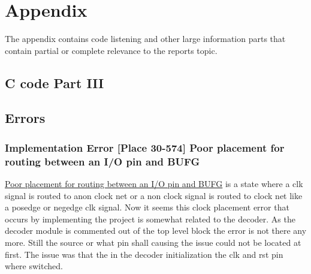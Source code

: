 \section{Appendix} \label{sec: Appendix}
The appendix contains code listening and other large information parts that contain partial or complete relevance to the reports topic. 
\subsection{C code Part III} \label{subsec: C code}



\subsection{Errors}\label{subsec: Errors}
\subsubsection{Implementation Error [Place 30-574] Poor placement for routing between an I/O pin and BUFG} \label{subsubsec: Poor placement for routing between an I/O pin and BUFG}
\href{https://wiki.nus.edu.sg/pages/viewpage.action?pageId=167808307}{Poor placement for routing between an I/O pin and BUFG} is a state where a clk signal is routed to anon clock net or a non clock signal is routed to clock net like a posedge or negedge clk signal.
Now it seems this clock placement error that occurs by implementing the project is somewhat related to the decoder. As the decoder module is commented out of the top level block the error is not there any more. Still the source or what pin shall causing the issue could not be located at first.
The issue was that the in the decoder initialization the clk and rst pin where switched.


